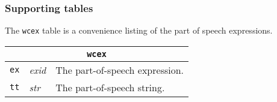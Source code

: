 \subsubsection{Supporting tables}

The {\tt wcex} table is a convenience listing of the part of
speech expressions.

\begin{trivlist}\item
\begin{tabular}{|llp{3.5in}|}
\hline
\multicolumn{3}{|c|}{\tt wcex}\\
\hline
{\tt ex} & {\it exid} & The part-of-speech expression.\\
{\tt tt} & {\it str}  & The part-of-speech string.\\
\hline
\end{tabular}
\end{trivlist}


